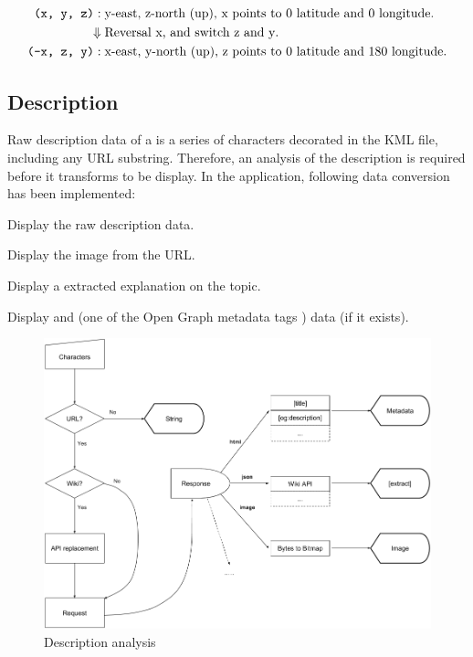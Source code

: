 \[
\begin{array}{lr}
\begin{aligned}
\texttt{(x, y, z)}:\;&\text{y-east, z-north (up), x points to $0$ latitude and $0$ longitude}.\\
\Downarrow\;&\text{Reversal x, and switch z and y}.\\
\texttt{(-x, z, y)}:\;&\text{x-east, y-north (up), z points to $0$ latitude and $180$ longitude}.\\
\end{aligned}
\end{array}
\]

\subsection{Description}

Raw description data of a  is a series of characters decorated in the KML file, including any URL substring. Therefore, an analysis of the description is required before it transforms to be display. In the application, following data conversion has been implemented:

\begin{description}
\setlength{\parskip}{0pt}
\item[$\bullet$ Plain text] Display the raw description data.
\item[$\bullet$ Image] Display the image from the URL.
\item[$\bullet$ Wikipedia] Display a extracted explanation on the topic.
\item[$\bullet$ HTML] Display  and  (one of the Open Graph metadata tags \cite{ogp.2014}) data (if it exists).
\end{description}

\begin{figure}[H]
\caption{Description analysis}
\label{fig:description-analysis}
\centering
\includegraphics[width=\textwidth, keepaspectratio]{Figures/description-analysis.png}
\decoRule
\end{figure}

